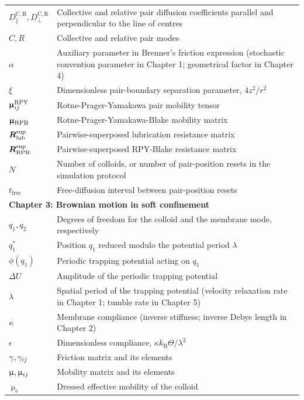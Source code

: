 \begin{longtable}{p{3cm}p{11cm}}
$D_\parallel^{\mathrm{C,R}},D_\perp^{\mathrm{C,R}}$ & Collective and relative pair diffusion coefficients parallel and perpendicular to the line of centres \\
$C,R$ & Collective and relative pair modes \\
$\alpha$ & Auxiliary parameter in Brenner's friction expression (stochastic convention parameter in Chapter 1; geometrical factor in Chapter 4) \\
$\xi$ & Dimensionless pair-boundary separation parameter, $4z^2/r^2$ \\
$\bm{\upmu}_{ij}^{\mathrm{RPY}}$ & Rotne-Prager-Yamakawa pair mobility tensor \\
$\bm{\upmu}_\mathrm{RPB}$ & Rotne-Prager-Yamakawa-Blake mobility matrix \\
$\bm{R}_\mathrm{lub}^{\mathrm{sup}}$ & Pairwise-superposed lubrication resistance matrix \\
$\bm{R}_\mathrm{RPB}^{\mathrm{sup}}$ & Pairwise-superposed RPY-Blake resistance matrix \\
$N$ & Number of colloids, or number of pair-position resets in the simulation protocol \\
$t_\mathrm{free}$ & Free-diffusion interval between pair-position resets \\
\hline
\multicolumn{2}{l}{\textbf{Chapter 3: Brownian motion in soft confinement}}\\
$q_1,q_2$ & Degrees of freedom for the colloid and the membrane mode, respectively \\
$q_1^*$ & Position $q_1$ reduced modulo the potential period $\lambda$ \\
$\phi(q_1)$ & Periodic trapping potential acting on $q_1$ \\
$\Delta U$ & Amplitude of the periodic trapping potential \\
$\lambda$ & Spatial period of the trapping potential (velocity relaxation rate in Chapter 1; tumble rate in Chapter 5) \\
$\kappa$ & Membrane compliance (inverse stiffness; inverse Debye length in Chapter 2) \\
$\epsilon$ & Dimensionless compliance, $\kappa k_\mathrm{B}\Theta/\lambda^2$ \\
$\mathbf{\gamma},\gamma_{ij}$ & Friction matrix and its elements \\
$\mathbf{\upmu},\upmu_{ij}$ & Mobility matrix and its elements \\
$\upmu_\mathrm{e}$ & Dressed effective mobility of the colloid \\

\end{longtable}
